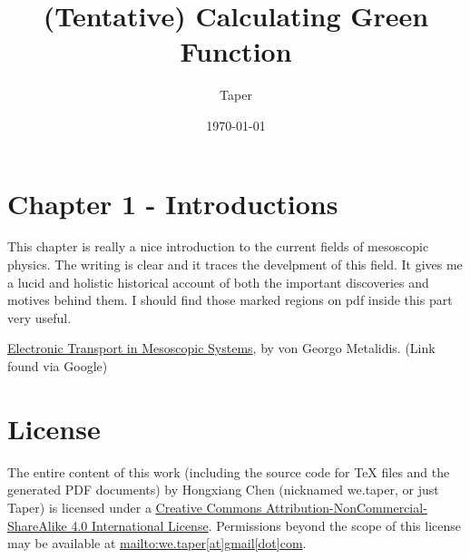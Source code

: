 \documentclass{article}
\title{(Tentative) Calculating Green Function}
\date{\today}
\author{Taper}
\numberwithin{equation}{subsection} %
\theoremstyle{definition}
\begin{document}
\maketitle
{}
\tableofcontents

\section{Chapter 1 - Introductions}
\label{sec:Chapter 1 - Introductions}
This chapter is really a nice introduction to the current fields of mesoscopic physics.
The writing is clear and it traces the develpment of this field. It gives me a lucid
and holistic historical account of both the important discoveries and motives behind
them. I should find those marked regions on pdf inside this part very useful.

\begin{thebibliography}{1}
        \href{https://sundoc.bibliothek.uni-halle.de/diss-online/07/07H039/prom.pdf}{Electronic Transport in Mesoscopic Systems}, 
        by von Georgo Metalidis. (Link found via Google)
\end{thebibliography}
\section{License}
The entire content of this work (including the source code
for TeX files and the generated PDF documents) by 
Hongxiang Chen (nicknamed we.taper, or just Taper) is
licensed under a 
\href{http://creativecommons.org/licenses/by-nc-sa/4.0/}{Creative 
Commons Attribution-NonCommercial-ShareAlike 4.0 International 
License}. Permissions beyond the scope of this 
license may be available at \url{mailto:we.taper[at]gmail[dot]com}.
\end{document}
